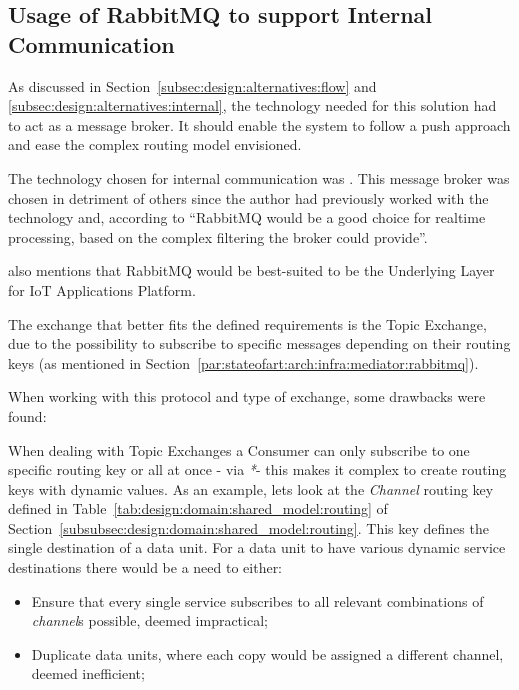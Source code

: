 \subsection{Usage of RabbitMQ to support Internal Communication}
\label{subsec:implementation:decisions:rabbitmq}

As discussed in Section~\ref{subsec:design:alternatives:flow} and \ref{subsec:design:alternatives:internal}, the technology needed for this solution had to act as a message broker. It should enable the system to follow a push approach and ease the complex routing model envisioned.

The technology chosen for internal communication was . This message broker was chosen in detriment of others since the author had previously worked with the technology and, according to \cite{10.1145/3093742.3093908} ``RabbitMQ would be a good choice for realtime processing, based on the complex filtering the broker could provide''.

\cite{10.1145/3093742.3093908} also mentions that RabbitMQ would be best-suited to be the Underlying Layer for IoT Applications Platform.

The exchange that better fits the defined requirements is the Topic Exchange, due to the possibility to subscribe to specific messages depending on their routing keys (as mentioned in Section~\ref{par:stateofart:arch:infra:mediator:rabbitmq}).

When working with this protocol and type of exchange, some drawbacks were found:

When dealing with Topic Exchanges a Consumer can only subscribe to one specific routing key or all at once - via \textit{*}- this makes it complex to create routing keys with dynamic values. As an example, lets look at the \textit{Channel} routing key defined in Table~\ref{tab:design:domain:shared_model:routing} of Section~\ref{subsubsec:design:domain:shared_model:routing}. This key defines the single destination of a data unit. For a data unit to have various dynamic service destinations there would be a need to either:

\begin{itemize}
    \item Ensure that every single service subscribes to all relevant combinations of \textit{channel}s possible, deemed impractical;
    \item Duplicate data units, where each copy would be assigned a different channel, deemed inefficient;
\end{itemize}

